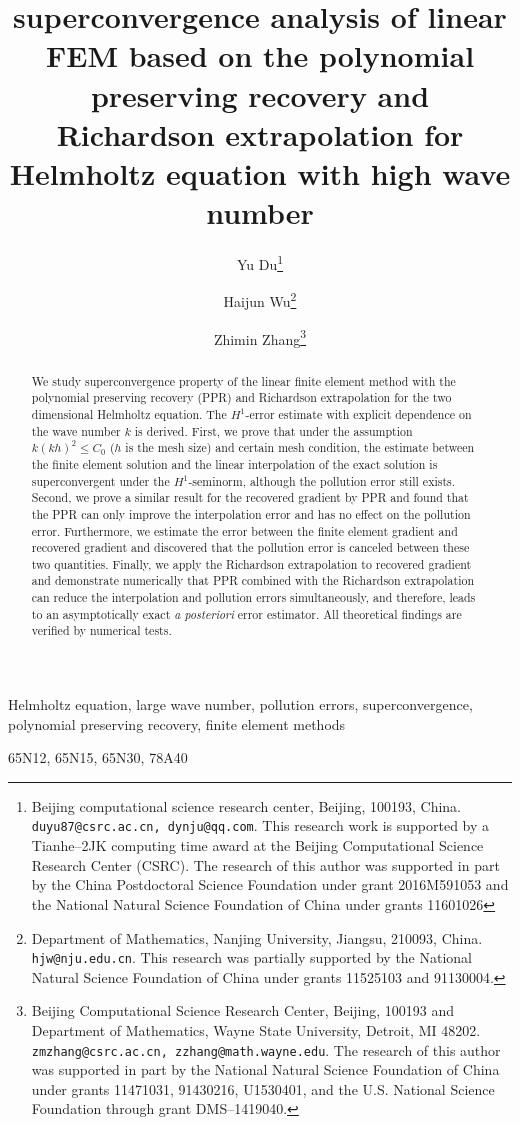 \documentclass[leqno,final]{siamltex}
\title{superconvergence analysis of linear FEM based on the polynomial preserving recovery and Richardson extrapolation for\\ Helmholtz equation with high wave number}
\author{
Yu Du\footnotemark[1]
\thanks{Beijing computational science research center, Beijing, 100193, China. {\tt duyu87@csrc.ac.cn, dynju@qq.com}.
This research work is supported by a Tianhe--2JK computing time award at the Beijing Computational Science Research Center (CSRC).
The research of this author was supported in part by the China Postdoctoral Science Foundation under grant 2016M591053
and the National Natural Science Foundation of China under grants 11601026}
 \and
Haijun Wu\footnotemark[2]
\thanks{Department of Mathematics, Nanjing University, Jiangsu,
210093, China. {\tt hjw@nju.edu.cn}. This research was
partially supported by the National Natural Science Foundation of China under grants 11525103 and 91130004.}
\and
Zhimin Zhang\footnotemark[3]
\thanks{Beijing Computational Science Research Center, Beijing, 100193 and Department of Mathematics, Wayne State University, Detroit, MI 48202. {\tt zmzhang@csrc.ac.cn, zzhang@math.wayne.edu}. The research of this author was supported in part by the National Natural Science Foundation of China under grants 11471031, 91430216, U1530401, and the U.S. National Science Foundation through grant DMS--1419040.}
}
\numberwithin{equation}{section}
\begin{document}
\maketitle

\vspace{-1.4in}
\vspace{1.4in}

\setcounter{page}{1}

\begin{abstract} We study superconvergence property
of the linear finite element method with the polynomial preserving recovery (PPR)
and Richardson extrapolation for the two dimensional Helmholtz equation. The $H^1$-error estimate
with explicit dependence on the wave number $k$ {is} derived.
 First, we prove that under the assumption $k(kh)^2\leq C_0$ ($h$ is the mesh size) and certain mesh condition,
 the estimate between the finite element solution and the linear interpolation of
the exact solution is superconvergent under the $H^1$-seminorm, although the pollution error still exists.
Second, we prove a similar result for the recovered gradient by PPR and
found that the PPR can only improve the interpolation error and has no effect on the pollution error.
Furthermore, we estimate the error between the finite element gradient and recovered gradient and discovered that
the pollution error is canceled between these two quantities.
Finally, we apply the Richardson extrapolation to recovered gradient and demonstrate
numerically that PPR combined with the Richardson extrapolation can reduce the interpolation and pollution
errors simultaneously, and therefore, leads to an asymptotically exact {\it a posteriori} error estimator.
All theoretical findings are verified by numerical tests.
\end{abstract}


\begin{keywords}
Helmholtz equation, large wave number, pollution errors,
superconvergence, polynomial preserving recovery, finite element methods
\end{keywords}

\begin{AMS}
65N12, %
65N15, %
65N30, %
78A40  %
\end{AMS}

\setcounter{page}{1}
\end{document}
